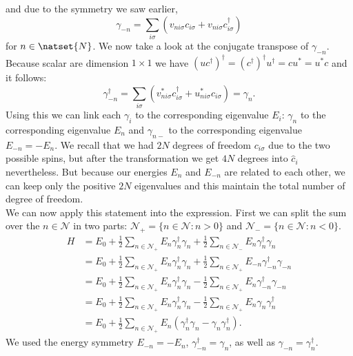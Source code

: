 \documentclass[../main.tex]{subfile}
\begin{document}
and due to the symmetry we saw earlier, 
\[
    \gamma_{-n} =  \sum_{i\sigma} \left( v_{ni\sigma}c_{i\sigma}+ v_{ni\sigma}c_{i\sigma}^{\dagger}\right)
\]
for $n\in \natset{N}$. We now take a look at the conjugate transpose of $\gamma_{-n}$. Because scalar are dimension $1\times1$ we have 
$(uc^{\dagger})^{\dagger} = (c^{\dagger})^{\dagger} u^{\dagger} =  c u^{\ast} = u^{\ast}c$ and it follows:
\[
    \gamma_{-n}^{\dagger} = \sum_{i\sigma} \left( v_{ni\sigma}^{\ast}c_{i\sigma}^{\dagger}+ u_{ni\sigma}^{\ast}c_{i\sigma}\right) = \gamma_n.
\]
Using this we can link each $\gamma_i$ to the corresponding eigenvalue $E_i$:  $\gamma_n$ to the corresponding eigenvalue $E_n$ and $\gamma_{n-}$ 
to the corresponding eigenvalue $E_{-n} = -E_n$.
We recall that we had $2N$ degrees of freedom $c_{i\sigma}$ due
to the two possible spins, but after the transformation we get $4N$ degrees into $\hat{c}_i$ nevertheless. 
But because our energies $E_n$ and $E_{-n}$ are related to each other, we can keep only the positive $2N$ eigenvalues
and this maintain the total number of degree of freedom.\\

We can now apply this statement into the expression. First we can split the sum over the $n\in\mathcal{N}$ in two parts: $\mathcal{N}_+ = \{n \in \mathcal{N} : n> 0 \}$ and
 $\mathcal{N}_- = \{n \in \mathcal{N} : n<0 \}$.
\begin{align*}
    H &= E_0 + \frac{1}{2}\sum_{n\in\mathcal{N}_+} E_n \gamma^{\dagger}_n\gamma_n + \frac{1}{2}\sum_{n\in\mathcal{N}_-} E_n \gamma^{\dagger}_n\gamma_n\\
      &= E_0 + \frac{1}{2}\sum_{n\in\mathcal{N}_+} E_n \gamma^{\dagger}_n\gamma_n + \frac{1}{2}\sum_{n\in\mathcal{N}_+} E_{-n} \gamma^{\dagger}_{-n}\gamma_{-n}\\
      &= E_0 + \frac{1}{2}\sum_{n\in\mathcal{N}_+} E_n \gamma^{\dagger}_n\gamma_n - \frac{1}{2}\sum_{n\in\mathcal{N}_+} E_n \gamma^{\dagger}_{-n}\gamma_{-n}\\
      &= E_0 + \frac{1}{2}\sum_{n\in\mathcal{N}_+} E_n \gamma^{\dagger}_n\gamma_n - \frac{1}{2}\sum_{n\in\mathcal{N}_+} E_n \gamma_{n}\gamma^{\dagger}_{n}\\
      &= E_0 + \frac{1}{2}\sum_{n\in\mathcal{N}_+} E_n \left( \gamma^{\dagger}_n\gamma_n -\gamma_{n}\gamma^{\dagger}_{n}\right).
\end{align*}
We used the energy symmetry $E_{-n} = -E_n$, $\gamma^{\dagger}_{-n} =\gamma_{n}$, as well as $\gamma_{-n} =\gamma^{\dagger}_{n}$.\\
\end{document}
